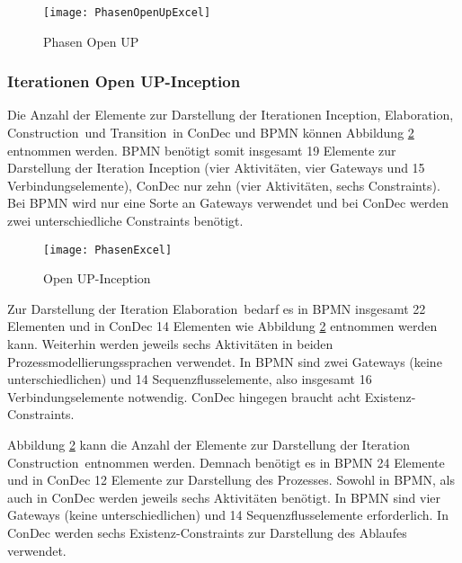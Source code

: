 \begin{figure}[htp]
\begin{center}
  \texttt{[image: PhasenOpenUpExcel]} %
  \caption{Phasen Open UP}
  \label{fig:PhasenOpenUpExcel}
\end{center}
\end{figure}



\subsubsection {Iterationen Open UP-Inception}

Die Anzahl der Elemente zur Darstellung der Iterationen \grqq Inception\grqq, \grqq Elaboration\grqq, \grqq Construction\grqq \ und \grqq Transition\grqq \ in ConDec und BPMN können Abbildung \ref{fig:PhasenExcel} entnommen werden. BPMN benötigt somit insgesamt 19 Elemente zur Darstellung der Iteration Inception (vier Aktivitäten, vier Gateways und 15 Verbindungselemente), ConDec nur zehn (vier Aktivitäten, sechs Constraints). Bei BPMN wird nur eine Sorte an Gateways verwendet und bei ConDec werden zwei unterschiedliche Constraints benötigt.\newline
\begin{figure}[htp]
\begin{center}
  \texttt{[image: PhasenExcel]} %
  \caption{Open UP-Inception}
  \label{fig:PhasenExcel}
\end{center}
\end{figure}

Zur Darstellung der Iteration \grqq Elaboration\grqq \ bedarf es in BPMN insgesamt 22 Elementen und in ConDec 14 Elementen wie Abbildung \ref{fig:PhasenExcel} entnommen werden kann. Weiterhin werden jeweils sechs Aktivitäten in beiden Prozessmodellierungssprachen verwendet. In BPMN sind zwei Gateways (keine unterschiedlichen) und 14 Sequenzflusselemente, also insgesamt 16 Verbindungselemente notwendig. ConDec hingegen braucht acht Existenz-Constraints. \newline

Abbildung \ref{fig:PhasenExcel} kann die Anzahl der Elemente zur Darstellung der Iteration \grqq Construction\grqq \ entnommen werden. Demnach benötigt es in BPMN 24 Elemente und in ConDec 12 Elemente zur Darstellung des Prozesses. Sowohl in BPMN, als auch in ConDec werden jeweils sechs Aktivitäten benötigt. In BPMN sind vier Gateways (keine unterschiedlichen) und 14 Sequenzflusselemente erforderlich. In ConDec werden sechs Existenz-Constraints zur Darstellung des Ablaufes verwendet.\newline



